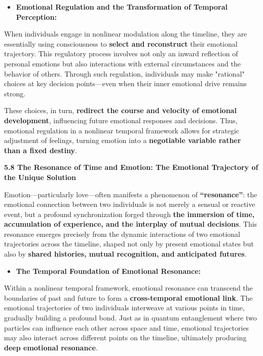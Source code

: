 \documentclass[
]{article}
\begin{document}
\begin{itemize}
\item
  \textbf{Emotional Regulation and the Transformation of Temporal
  Perception:}
\end{itemize}

When individuals engage in nonlinear modulation along the timeline, they
are essentially using consciousness to \textbf{select and reconstruct}
their emotional trajectory. This regulatory process involves not only an
inward reflection of personal emotions but also interactions with
external circumstances and the behavior of others. Through such
regulation, individuals may make "rational" choices at key decision
points---even when their inner emotional drive remains strong.

These choices, in turn, \textbf{redirect the course and velocity of
emotional development}, influencing future emotional responses and
decisions. Thus, emotional regulation in a nonlinear temporal framework
allows for strategic adjustment of feelings, turning emotion into a
\textbf{negotiable variable rather than a fixed destiny}.

\textbf{5.8 The Resonance of Time and Emotion: The Emotional Trajectory
of the Unique Solution}

Emotion---particularly love---often manifests a phenomenon of
\textbf{``resonance''}: the emotional connection between two individuals
is not merely a sensual or reactive event, but a profound
synchronization forged through \textbf{the immersion of time,
accumulation of experience, and the interplay of mutual decisions}. This
resonance emerges precisely from the dynamic interactions of two
emotional trajectories across the timeline, shaped not only by present
emotional states but also by \textbf{shared histories, mutual
recognition, and anticipated futures}.

\begin{itemize}
\item
  \textbf{The Temporal Foundation of Emotional Resonance:}
\end{itemize}

Within a nonlinear temporal framework, emotional resonance can transcend
the boundaries of past and future to form a \textbf{cross-temporal
emotional link}. The emotional trajectories of two individuals
interweave at various points in time, gradually building a profound
bond. Just as in quantum entanglement where two particles can influence
each other across space and time, emotional trajectories may also
interact across different points on the timeline, ultimately producing
\textbf{deep emotional resonance}.
\end{document}
